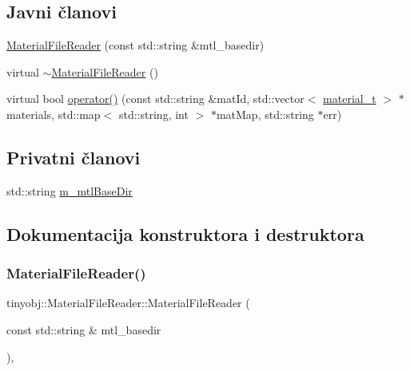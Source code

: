 \subsection*{Javni članovi}
\begin{DoxyCompactItemize}
\item 
\hyperlink{classtinyobj_1_1MaterialFileReader_aeb0c6d0e32d7876394e570a7b18adc8a}{Material\+File\+Reader} (const std\+::string \&mtl\+\_\+basedir)
\item 
virtual \hyperlink{classtinyobj_1_1MaterialFileReader_a0a00d236393f9972b676a2fb6fe2b819}{$\sim$\+Material\+File\+Reader} ()
\item 
virtual bool \hyperlink{classtinyobj_1_1MaterialFileReader_a23fa55532224cbcc927233f4b57f53df}{operator()} (const std\+::string \&mat\+Id, std\+::vector$<$ \hyperlink{structtinyobj_1_1material__t}{material\+\_\+t} $>$ $\ast$materials, std\+::map$<$ std\+::string, int $>$ $\ast$mat\+Map, std\+::string $\ast$err)
\end{DoxyCompactItemize}
\subsection*{Privatni članovi}
\begin{DoxyCompactItemize}
\item 
std\+::string \hyperlink{classtinyobj_1_1MaterialFileReader_aeb0081a32915ccf6c5c0612335eef560}{m\+\_\+mtl\+Base\+Dir}
\end{DoxyCompactItemize}


\subsection{Dokumentacija konstruktora i destruktora}
\mbox{\label{classtinyobj_1_1MaterialFileReader_aeb0c6d0e32d7876394e570a7b18adc8a}} 
\subsubsection{\texorpdfstring{Material\+File\+Reader()}{MaterialFileReader()}}
{\footnotesize\ttfamily tinyobj\+::\+Material\+File\+Reader\+::\+Material\+File\+Reader (\begin{DoxyParamCaption}\item[{const std\+::string \&}]{mtl\+\_\+basedir }\end{DoxyParamCaption})\hspace{0.3cm}{\ttfamily [inline]}, {\ttfamily [explicit]}}

